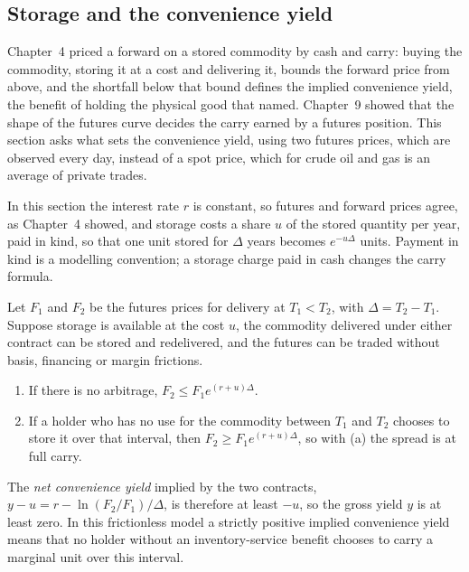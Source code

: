 \begin{chapterrefs}
\section{Storage and the convenience yield}
\label{sec10:storage}

Chapter~4 priced a forward on a stored commodity by cash and carry: buying the commodity, storing it at a
cost and delivering it, bounds the forward price from above, and the shortfall below that bound defines
the implied convenience yield, the benefit of holding the physical good that \textcite{kaldor1939} named.
Chapter~9 showed that the shape of the futures curve decides the carry earned by a futures position. This
section asks what sets the convenience yield, using two futures prices, which are observed every day,
instead of a spot price, which for crude oil and gas is an average of private trades.

In this section the interest rate $r$ is constant, so futures and forward prices agree, as Chapter~4
showed, and storage costs a share $u$ of the stored quantity per year, paid in kind, so that one unit
stored for $\Delta$ years becomes $e^{-u\Delta}$ units. Payment in kind is a modelling convention; a
storage charge paid in cash changes the carry formula.

\begin{proposition}\label{prop10:storage}
Let $F_1$ and $F_2$ be the futures prices for delivery at $T_1<T_2$, with $\Delta=T_2-T_1$. Suppose storage
is available at the cost $u$, the commodity delivered under either contract can be stored and
redelivered, and the futures can be traded without basis, financing or margin frictions.
\begin{enumerate}[label=(\alph*)]
  \item If there is no arbitrage, $F_2\le F_1e^{(r+u)\Delta}$.
  \item If a holder who has no use for the commodity between $T_1$ and $T_2$ chooses to store it over that
        interval, then $F_2\ge F_1e^{(r+u)\Delta}$, so with (a) the spread is at full carry.
\end{enumerate}
The \emph{net convenience yield} implied by the two contracts, $y-u=r-\ln(F_2/F_1)/\Delta$, is
therefore at least $-u$, so the gross yield $y$ is at least zero. In this frictionless model a strictly
positive implied convenience yield means that no holder without an inventory-service benefit chooses to
carry a marginal unit over this interval.
\end{proposition}


\end{chapterrefs}

